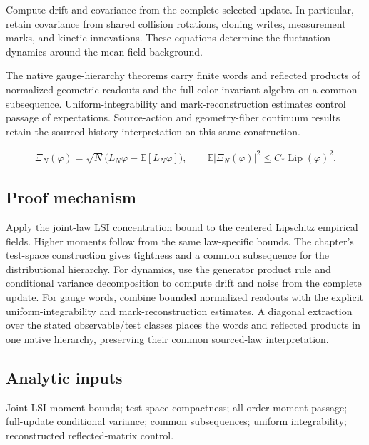\documentclass[11pt,a4paper]{article}
\begin{document}
Compute drift and covariance from the complete selected update. In particular, retain covariance from shared collision rotations, cloning writes, measurement marks, and kinetic innovations. These equations determine the fluctuation dynamics around the mean-field background.

The native gauge-hierarchy theorems carry finite words and reflected products of normalized geometric readouts and the full color invariant algebra on a common subsequence. Uniform-integrability and mark-reconstruction estimates control passage of expectations. Source-action and geometry-fiber continuum results retain the sourced history interpretation on this same construction.


\begin{gather*}
\Xi_N(\varphi)=\sqrt N\bigl(L_N\varphi-\mathbb E[L_N\varphi]\bigr),\qquad
\mathbb E|\Xi_N(\varphi)|^2\le C_*\operatorname{Lip}(\varphi)^2.
\end{gather*}
\subsection*{Proof mechanism}
Apply the joint-law LSI concentration bound to the centered Lipschitz empirical fields. Higher moments follow from the same law-specific bounds. The chapter's test-space construction gives tightness and a common subsequence for the distributional hierarchy. For dynamics, use the generator product rule and conditional variance decomposition to compute drift and noise from the complete update. For gauge words, combine bounded normalized readouts with the explicit uniform-integrability and mark-reconstruction estimates. A diagonal extraction over the stated observable/test classes places the words and reflected products in one native hierarchy, preserving their common sourced-law interpretation.
\subsection*{Analytic inputs}
Joint-LSI moment bounds; test-space compactness; all-order moment passage; full-update conditional variance; common subsequences; uniform integrability; reconstructed reflected-matrix control.
\end{document}
